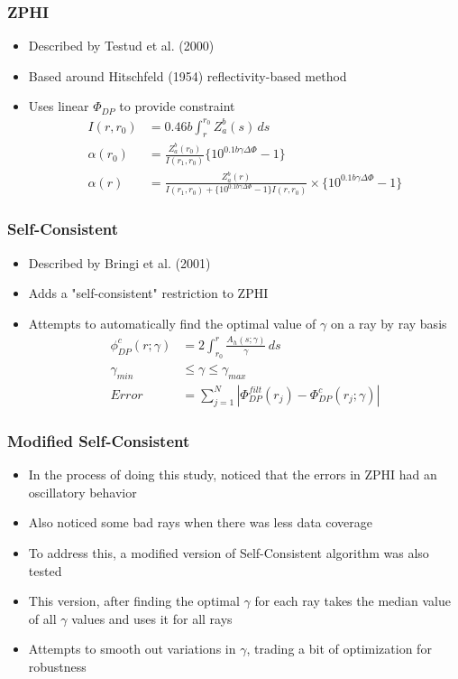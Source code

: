 \documentclass[red]{beamer}
\begin{document}
\begin{frame}
	\frametitle{ZPHI}
	\begin{itemize}
		\item Described by Testud et al. (2000)
		\item Based around Hitschfeld (1954) reflectivity-based method
		\item Uses linear $\Phi_{DP}$ to provide constraint
			\begin{align*}
			I(r, r_0) &= \num{0.46}b\int_r^{r_0}Z_a^b(s)\,ds \\
			\alpha(r_0) &= \frac{Z_a^b(r_0)}{I(r_1,r_0)} \lbrace 10^{\num{0.1}b\gamma\Delta\Phi} - 1\rbrace \\
			\alpha(r) &= \frac{Z_a^b(r)}{I(r_1,r_0) + \lbrace 10^{\num{0.1}b\gamma\Delta\Phi} - 1\rbrace I(r, r_0)}
			  \times \lbrace 10^{\num{0.1}b\gamma\Delta\Phi} - 1\rbrace
			\end{align*}
	\end{itemize}
\end{frame}

\begin{frame}
	\frametitle{Self-Consistent}
	\begin{itemize}
		\item Described by Bringi et al. (2001)
		\item Adds a "self-consistent" restriction to ZPHI
		\item Attempts to automatically find the optimal value of $\gamma$
		on a ray by ray basis
			 \begin{align*}
			\phi_{DP}^c(r;\gamma) &= 2 \int_{r_0}^r \frac{A_h(s;\gamma)}{\gamma}\,ds \\
			\gamma_{min} &\leq \gamma \leq \gamma_{max} \\
			Error &= \sum_{j=1}^N \left| \Phi_{DP}^{filt}(r_j) - \Phi_{DP}^c(r_j;\gamma) \right|
			\end{align*}
	\end{itemize}
\end{frame}

\begin{frame}[<+->]
	\frametitle{Modified Self-Consistent}
	\begin{itemize}
		\item In the process of doing this study, noticed that the errors in ZPHI
		had an oscillatory behavior
		\item Also noticed some bad rays when there was less data coverage
		\item To address this, a modified version of Self-Consistent algorithm
		was also tested
		\item This version, after finding the optimal $\gamma$ for each ray
		takes the median value of all $\gamma$ values and uses it for all rays
		\item Attempts to smooth out variations in $\gamma$, trading a bit of
		optimization for robustness
	\end{itemize}
\end{frame}
\end{document}
